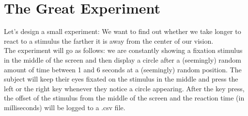 \section{The Great Experiment}
Let's design a small experiment: We want to find out whether we take longer
to react to a stimulus the farther it is away from the center of our vision.\\
The experiment will go as follows: we are constantly showing a fixation stimulus
in the middle of the screen and then display a circle after a (seemingly) random
amount of time between 1 and 6 seconds at a (seemingly) random position.
The subject will keep their eyes fixated on the stimulus in the middle and press
the left or the right key whenever they notice a circle appearing.
After the key press, the offset of the stimulus from the middle of the screen
and the reaction time (in milliseconds) will be logged to a .csv file.\\

